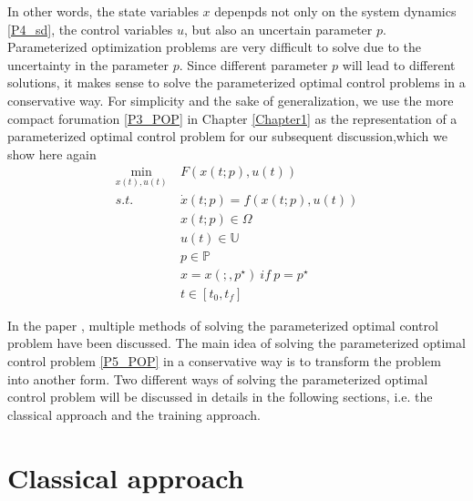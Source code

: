 \documentclass  [
  paper    = a4,
  BCOR     = 10mm,
  twoside,
  fontsize = 12pt,
  fleqn,
  toc      = bibnumbered,
  toc      = listofnumbered,
  numbers  = noendperiod,
  headings = normal,
  listof   = leveldown,
  version  = 3.03
]                                       {scrreprt}
\newcommand{\<}{\langle}
\renewcommand{\>}{\rangle}
\begin{document}
In other words, the state variables $x$ depenpds not only on the system dynamics \ref{P4_sd}, the control variables $u$, but also an uncertain parameter $p$. Parameterized optimization problems are very difficult to solve due to the uncertainty in the parameter $p$. Since different parameter $p$ will lead to different solutions, it makes sense to solve the parameterized optimal control problems in a conservative way. For simplicity and the sake of generalization, we use the more compact forumation  \ref{P3_POP} in  Chapter \ref{Chapter1} as the representation of a parameterized optimal control problem for our subsequent discussion,which we show  here again
      \begin{equation}
	\begin{aligned}
	\underset{x(t), u(t)}{\text{min}}  \ &  F(x(t;p), u(t)) \\
	s.t.\ \  &  \dot{x} (t;p) = f(x(t;p), u(t))\\ 
	& x(t;p) \in \Omega \\
	& u(t) \in \mathbb{U}  \\
	& p  \in   \mathbb{P}  \\
	& x = x(;,p^\star) \ if \ p = p^\star \\
	& t \in [t_0, t_f]
\end{aligned}
	\label{P5_POP}
\end{equation}

 In the paper \cite{MatSch22}, multiple methods of solving the parameterized optimal control problem have been discussed. The main idea of solving the parameterized optimal control problem \ref{P5_POP}  in a conservative way is to transform the problem into another form. Two different ways of solving the parameterized optimal control problem will be discussed in details in the following sections, i.e. the classical approach and the training approach. 



\section{Classical approach}
\label{Sec:CA}
\end{document}
